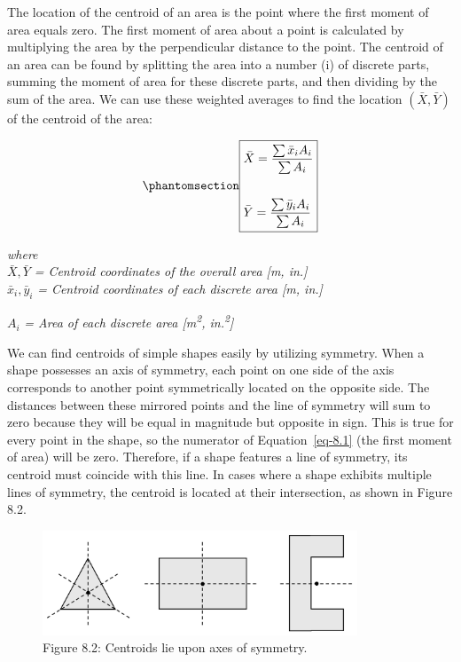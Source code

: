 \documentclass[
  letterpaper,
  DIV=11,
  numbers=noendperiod]{scrreprt}
\theoremstyle{definition}
\theoremstyle{remark}
\begin{document}
The location of the centroid of an area is the point where the first
moment of area equals zero. The first moment of area about a point is
calculated by multiplying the area by the perpendicular distance to the
point. The centroid of an area can be found by splitting the area into a
number (i) of discrete parts, summing the moment of area for these
discrete parts, and then dividing by the sum of the area. We can use
these weighted averages to find the location \((\bar{X}, \bar{Y})\) of
the centroid of the area:

\begin{equation}\phantomsection\label{eq-8.1}{
\boxed{\begin{aligned}
&\bar{X}=\frac{\sum \bar{x}_i A_i}{\sum A_i} \\
\\
&\bar{Y}=\frac{\sum \bar{y}_i A_i}{\sum A_i}
\end{aligned}}
}\end{equation}

\emph{where}\\
\(\bar{X}, \bar{Y}\) \emph{= Centroid coordinates of the overall area
{[}m, in.{]}}\\
\(\bar{x}_i, \bar{y}_i\) \emph{= Centroid coordinates of each discrete
area {[}m, in.{]}}

\(A_i\) \emph{= Area of each discrete area {[}m\textsuperscript{2},
in.\textsuperscript{2}{]}}

We can find centroids of simple shapes easily by utilizing symmetry.
When a shape possesses an axis of symmetry, each point on one side of
the axis corresponds to another point symmetrically located on the
opposite side. The distances between these mirrored points and the line
of symmetry will sum to zero because they will be equal in magnitude but
opposite in sign. This is true for every point in the shape, so the
numerator of Equation~\ref{eq-8.1} (the first moment of area) will be
zero. Therefore, if a shape features a line of symmetry, its centroid
must coincide with this line. In cases where a shape exhibits multiple
lines of symmetry, the centroid is located at their intersection, as
shown in Figure 8.2.

\begin{figure}[H]

{\centering \includegraphics[width=3.69792in,height=\textheight]{images/CH 8 PNGs/figure 8.2.png}

}

\caption{Figure 8.2: Centroids lie upon axes of symmetry.}

\end{figure}%
\end{document}
